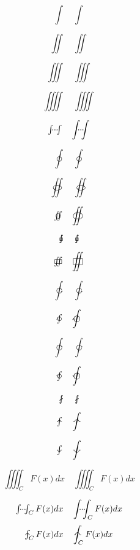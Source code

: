 \documentclass{article}
\begin{document}
\[
\textstyle \int \quad \displaystyle \int
\]

\[
\textstyle \iint \quad \displaystyle \iint
\]

\[
\textstyle \iiint \quad \displaystyle \iiint
\]

\[
\textstyle \iiiint \quad \displaystyle \iiiint
\]

\[
\textstyle \dotsint \quad \displaystyle \dotsint
\]

\[
\textstyle \oint \quad \displaystyle \oint
\]

\[
\textstyle \oiint \quad \displaystyle \oiint
\]

\[
\textstyle \varoiint \quad \displaystyle \oiint
\]

\[
\textstyle \sqint \quad \displaystyle \sqint
\]

\[
\textstyle \sqiint \quad \displaystyle \sqiint
\]

\[
\textstyle \ointctrclockwise \quad \displaystyle \ointctrclockwise
\]

\[
\textstyle \ointclockwise \quad \displaystyle \ointclockwise
\]

\[
\textstyle \varointclockwise \quad \displaystyle \varointclockwise
\]

\[
\textstyle \varointctrclockwise \quad \displaystyle \varointctrclockwise
\]

\[
\textstyle \fint \quad \displaystyle \fint
\]

\[
\textstyle \landupint \quad \displaystyle \landupint
\]

\[
\textstyle \landdownint \quad \displaystyle \landdownint
\]

\[
\textstyle \iiiint_C F(x)dx \quad \displaystyle \iiiint_C F(x)dx
\]

\[
\textstyle \dotsint_C F(x)dx \quad \displaystyle \dotsint_C F(x)dx
\]
\[
\textstyle \landupint_C F(x)dx \quad \displaystyle \landupint_C F(x)dx
\]
\end{document}

